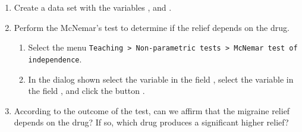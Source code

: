 \begin{enumerate}[leftmargin=*]
\begin{enumerate}
\item Create a data set with the variables , and .

\item Perform the McNemar's test to determine if the relief depends on the drug.  
\begin{indication}
\begin{enumerate}
\item Select the menu \texttt{Teaching > Non-parametric tests > McNemar test of indepen\-dence}.
\item In the dialog shown select the variable  in the field , select the variable  in the field , and click the button .
\end{enumerate}
\end{indication}

\item According to the outcome of the test, can we affirm that the migraine relief depends on the drug? If so, which drug produces a significant higher relief?
\end{enumerate}

\end{enumerate}


